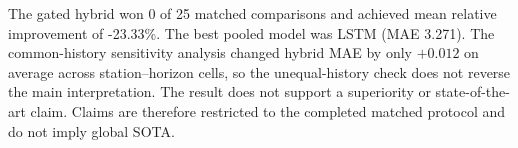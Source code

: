 The gated hybrid won 0 of 25 matched comparisons and achieved mean relative improvement of -23.33\%. The best pooled model was LSTM (MAE 3.271). The common-history sensitivity analysis changed hybrid MAE by only \(+0.012\) on average across station--horizon cells, so the unequal-history check does not reverse the main interpretation. The result does not support a superiority or state-of-the-art claim. Claims are therefore restricted to the completed matched protocol and do not imply global SOTA.

